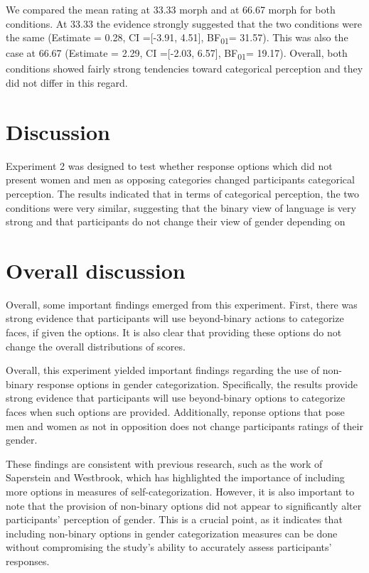 \documentclass[
  man]{apa7}
\begin{document}
We compared the mean rating at 33.33 morph and at 66.67 morph for both conditions. At 33.33 the evidence strongly suggested that the two conditions were the same
(Estimate = 0.28, CI ={[}-3.91, 4.51{]}, BF\textsubscript{01}= 31.57). This was also the case at 66.67
(Estimate = 2.29, CI ={[}-2.03, 6.57{]}, BF\textsubscript{01}= 19.17). Overall, both conditions showed fairly strong tendencies toward categorical perception and they did not differ in this regard.

\hypertarget{discussion-1}{%
\section{Discussion}\label{discussion-1}}

Experiment 2 was designed to test whether response options which did not present women and men as opposing categories changed participants categorical perception. The results indicated that in terms of categorical perception, the two conditions were very similar, suggesting that the binary view of language is very strong and that participants do not change their view of gender depending on

\hypertarget{overall-discussion}{%
\section{Overall discussion}\label{overall-discussion}}

Overall, some important findings emerged from this experiment. First, there was strong evidence that participants will use beyond-binary actions to categorize faces, if given the options. It is also clear that providing these options do not change the overall distributions of scores.

Overall, this experiment yielded important findings regarding the use of non-binary response options in gender categorization. Specifically, the results provide strong evidence that participants will use beyond-binary options to categorize faces when such options are provided. Additionally, reponse options that pose men and women as not in opposition does not change participants ratings of their gender.

These findings are consistent with previous research, such as the work of Saperstein and Westbrook, which has highlighted the importance of including more options in measures of self-categorization. However, it is also important to note that the provision of non-binary options did not appear to significantly alter participants' perception of gender. This is a crucial point, as it indicates that including non-binary options in gender categorization measures can be done without compromising the study's ability to accurately assess participants' responses.
\end{document}
